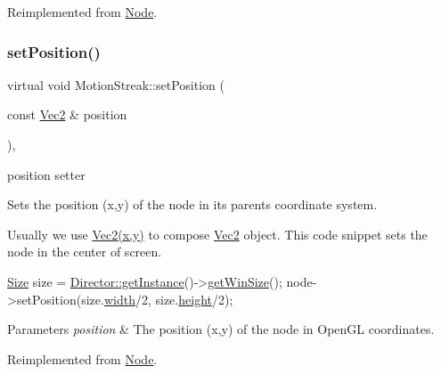 Reimplemented from \hyperlink{classNode_a8ffbf25763ef5f15eeae7227779505bc}{Node}.

\mbox{\label{classMotionStreak_a2b77305ae80661b9508b928cf0a1699d}} 
\subsubsection{\texorpdfstring{set\+Position()}{setPosition()}\hspace{0.1cm}{\footnotesize\ttfamily [2/4]}}
{\footnotesize\ttfamily virtual void Motion\+Streak\+::set\+Position (\begin{DoxyParamCaption}\item[{const \hyperlink{classVec2}{Vec2} \&}]{position }\end{DoxyParamCaption})\hspace{0.3cm}{\ttfamily [override]}, {\ttfamily [virtual]}}



position setter 

Sets the position (x,y) of the node in its parent\textquotesingle{}s coordinate system.

Usually we use {\ttfamily \hyperlink{classVec2}{Vec2(x,y)}} to compose \hyperlink{classVec2}{Vec2} object. This code snippet sets the node in the center of screen. 
\begin{DoxyCode}
\hyperlink{classSize}{Size} size = \hyperlink{classDirector_a8d2a4ca9e20cd400ddadd516efa111e0}{Director::getInstance}()->\hyperlink{classDirector_af07668df4a8916e6eb0f79a93f6588fe}{getWinSize}();
node->setPosition(size.\hyperlink{classSize_af0be19024ddd79e7843492b3760c21f0}{width}/2, size.\hyperlink{classSize_a880fa21eaad5a5a0fe439d440776fd05}{height}/2);
\end{DoxyCode}



\begin{DoxyParams}{Parameters}
{\em position} & The position (x,y) of the node in Open\+GL coordinates. \\
\hline
\end{DoxyParams}


Reimplemented from \hyperlink{classNode_a8ffbf25763ef5f15eeae7227779505bc}{Node}.

\mbox{\label{classMotionStreak_a8799ee17a6842cad944b85d67f1155d0}} 
